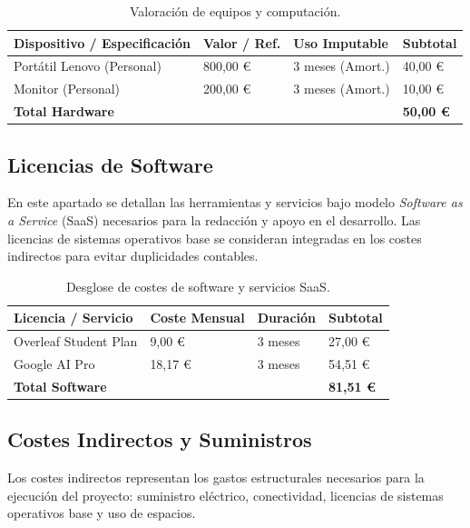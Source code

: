 \documentclass[11pt]{article}
\begin{document}
\begin{table}[h!]
\centering
\small
\begin{tabularx}{\textwidth}{lXXX}
\toprule
\textbf{Dispositivo / Especificación} & \textbf{Valor / Ref.} & \textbf{Uso Imputable} & \textbf{Subtotal} \\ \midrule
Portátil Lenovo (Personal) & 800,00 \euro & 3 meses (Amort.) & 40,00 \euro \\
Monitor (Personal) & 200,00 \euro & 3 meses (Amort.) & 10,00 \euro \\ \midrule
\textbf{Total Hardware} & & & \textbf{50,00 \euro} \\ \bottomrule
\end{tabularx}
\caption{Valoración de equipos y computación.}
\label{tab:presupuesto_hardware}
\end{table}

\subsection{Licencias de Software}

En este apartado se detallan las herramientas y servicios bajo modelo \textit{Software as a Service} (SaaS) necesarios para la redacción y apoyo en el desarrollo. Las licencias de sistemas operativos base se consideran integradas en los costes indirectos para evitar duplicidades contables.

\begin{table}[h!]
\centering
\small
\begin{tabularx}{\textwidth}{lXXX}
\toprule
\textbf{Licencia / Servicio} & \textbf{Coste Mensual} & \textbf{Duración} & \textbf{Subtotal} \\ \midrule
Overleaf Student Plan \cite{overleaf_pricing} & 9,00 \euro & 3 meses & 27,00 \euro \\
Google AI Pro \cite{google_ai_pricing} & 18,17 \euro & 3 meses & 54,51 \euro \\ \midrule
\textbf{Total Software} & & & \textbf{81,51 \euro} \\ \bottomrule
\end{tabularx}
\caption{Desglose de costes de software y servicios SaaS.}
\label{tab:software}
\end{table}

\subsection{Costes Indirectos y Suministros}

Los costes indirectos representan los gastos estructurales necesarios para la ejecución del proyecto: suministro eléctrico, conectividad, licencias de sistemas operativos base y uso de espacios.
\end{document}
